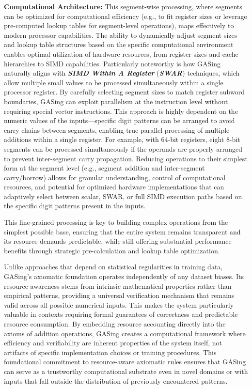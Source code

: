 \noindent\textbf{\textbf{Computational Architecture}:} This segment-wise processing, where segments can be optimized for computational efficiency (e.g., to fit register sizes or leverage pre-computed lookup tables for segment-level operations), maps effectively to modern processor capabilities. The ability to dynamically adjust segment sizes and lookup table structures based on the specific computational environment enables optimal utilization of hardware resources, from register sizes and cache hierarchies to SIMD capabilities. Particularly noteworthy is how GASing naturally aligns with \textbf{\textit{SIMD Within A Register}} (\textbf{\textit{SWAR}}) techniques, which allow multiple small values to be processed simultaneously within a single processor register. By carefully selecting segment sizes to match register subword boundaries, GASing can exploit parallelism at the instruction level without requiring special vector instructions. This approach is highly dependent on the numeric values of the inputs—specific digit patterns can be arranged to avoid carry chains between segments, enabling true parallel processing of multiple additions within a single register. For example, with 64-bit registers, eight 8-bit segments can be processed simultaneously if the operands are properly arranged to prevent inter-segment carry propagation. Reducing operations to their simplest form at the segment level (e.g., segment addition and inter-segment carry/borrow) allows for granular understanding, control of computational resources, and potential for optimized hardware implementations that can adaptively select between scalar, SWAR, or full SIMD execution paths based on the specific digit patterns present in the inputs.


This fine-grained processing is key to building complex operations from the simplest possible base, ensuring that the entire system remains transparent and its resource demands predictable, while still offering substantial performance benefits through strategic pre-calculation and lookup table optimization.

Unlike approaches that depend on statistical regularities in training data, GASing's axiomatic foundation operates independently of any dataset biases. Its resource awareness stems from intrinsic mathematical properties rather than empirical patterns, providing a universal verification mechanism that remains valid across all possible numerical inputs. This makes the system particularly valuable in contexts requiring formal guarantees of correctness and predictable resource consumption. By embedding resource accounting directly into the axioms of addition operations, GASing creates a computational framework where efficiency and verifiability are inherent properties of the system itself, not artifacts of specific implementation choices or training procedures. This foundational commitment to resource-aware axiomatic rules ensures that GASing can serve as a trustworthy computational substrate even in novel domains or with inputs that fall outside the distribution of previously encountered patterns.
